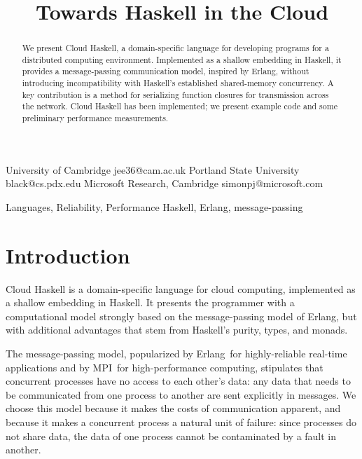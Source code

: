 \documentclass{sigplanconf}
\begin{document}
\title{Towards Haskell in the Cloud}
\subtitle{}

           {University of Cambridge}
           {jee36@cam.ac.uk}
           {Portland State University}
           {black@cs.pdx.edu}
           {Microsoft Research, Cambridge}
           {simonpj@microsoft.com}

\maketitle
\begin{abstract}
We present Cloud Haskell, a domain-specific language for developing programs for a distributed computing environment. Implemented as a shallow embedding in Haskell, it provides a message-passing communication model, inspired by Erlang, without introducing incompatibility with Haskell's established shared-memory concurrency. A key contribution is a method for serializing function closures for transmission across the network.
Cloud Haskell has been implemented; we present example code and some preliminary performance measurements.

\end{abstract}


%
%
\terms
Languages, Reliability, Performance
%
\keywords
Haskell, Erlang, message-passing
%
\section{Introduction}

Cloud Haskell is a domain-specific language for cloud computing, implemented as a shallow embedding in Haskell.
It presents the programmer with a computational model strongly based on the message-passing model of  Erlang, but with additional advantages that stem from Haskell's purity, types, and monads.  

The message-passing model, popularized by \mbox{Erlang}\,\cite{Erlang93} for highly-reliable real-time applications and by MPI\,\cite{mpi99} for high-performance computing, stipulates that concurrent processes have no access to each other's data: any data that needs to be communicated from one process to another are sent explicitly in messages.  
We choose this model because it makes the costs of communication apparent, and because it makes a concurrent process a natural unit of failure: since processes do not share data, the data of one process cannot be contaminated by a fault in another.
\end{document}
